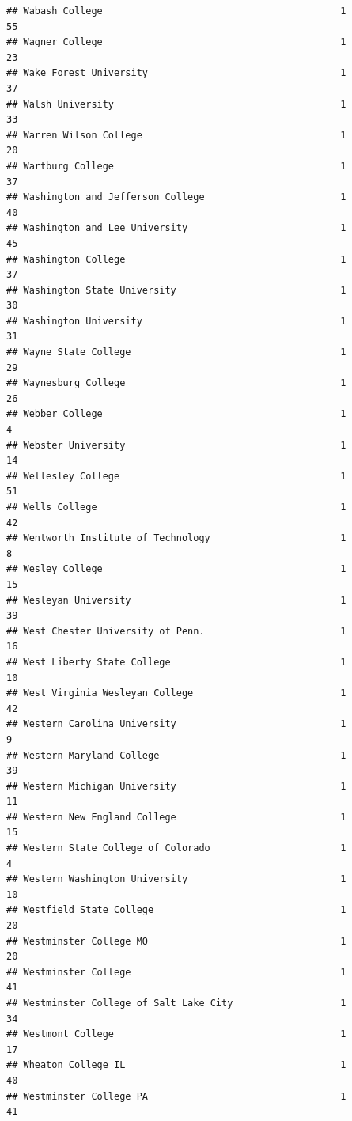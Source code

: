 \documentclass[
]{article}
\begin{document}
\begin{verbatim}
## Wabash College                                          1          55
## Wagner College                                          1          23
## Wake Forest University                                  1          37
## Walsh University                                        1          33
## Warren Wilson College                                   1          20
## Wartburg College                                        1          37
## Washington and Jefferson College                        1          40
## Washington and Lee University                           1          45
## Washington College                                      1          37
## Washington State University                             1          30
## Washington University                                   1          31
## Wayne State College                                     1          29
## Waynesburg College                                      1          26
## Webber College                                          1           4
## Webster University                                      1          14
## Wellesley College                                       1          51
## Wells College                                           1          42
## Wentworth Institute of Technology                       1           8
## Wesley College                                          1          15
## Wesleyan University                                     1          39
## West Chester University of Penn.                        1          16
## West Liberty State College                              1          10
## West Virginia Wesleyan College                          1          42
## Western Carolina University                             1           9
## Western Maryland College                                1          39
## Western Michigan University                             1          11
## Western New England College                             1          15
## Western State College of Colorado                       1           4
## Western Washington University                           1          10
## Westfield State College                                 1          20
## Westminster College MO                                  1          20
## Westminster College                                     1          41
## Westminster College of Salt Lake City                   1          34
## Westmont College                                        1          17
## Wheaton College IL                                      1          40
## Westminster College PA                                  1          41

\end{verbatim}
\end{document}
